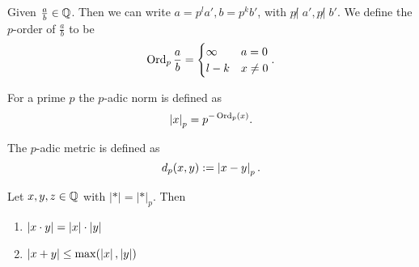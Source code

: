 \begin{definition}
	Given $\frac{a}{b} \in\mathbb{Q}$. Then we can write $a = p^{l} a', b = p^{k}b'$, with $p \not |\; a', p \not |\; b'$. We define the  $p$-order of $\frac{a}{b}$ to be \[
	\operatorname{Ord}_p \frac{a}{b} = \begin{cases}
		\infty  & a = 0 \\
		l - k & x \ne 0
	\end{cases}
	.\] 
\end{definition}
\begin{definition}
	For a prime $p$ the $p$-adic norm is defined as \[
		\left| x \right| _ p = p^{-\operatorname{Ord}_p(x)}
	.\] 
\end{definition}
\begin{definition}
	The $p$-adic metric is defined as \[
		d_p(x,y) := \left| x - y \right|_p
	.\] 
\end{definition}
\begin{lemma}
	Let $x, y, z \in \mathbb{Q}$ with $|*| = |*|_p$. Then 
	\begin{enumerate}
		\item $\left| x\cdot y \right|  = \left| x \right| \cdot  \left| y \right|$
		\item $\left| x + y \right| \le \max(\left| x \right|, \left| y \right|)$
	\end{enumerate}
\end{lemma}


